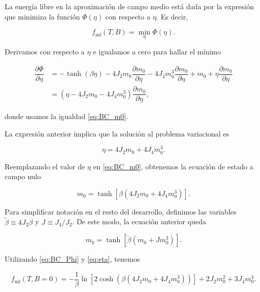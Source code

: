 \documentclass[10pt]{article}
\begin{document}
La energ\'ia libre en la aproximaci\'on de campo medio est\'a dada por la expresi\'on que minimiza la funci\'on $\Phi(\eta)$ con respecto a $\eta$. Es decir,

\begin{equation}
f_{\mathrm{mf}}(T,B) = \min_{\eta} \Phi(\eta).
\end{equation}

Derivamos con respecto a $\eta$ e igualamos a cero para hallar el m\'inimo

\begin{align}
\dfrac{\partial \Phi}{\partial \eta} &= - \tanh\left(\beta \eta\right) - 4 J_2 m_0 \dfrac{\partial m_0}{\partial \eta} - 4 J_4 m_0^3 \dfrac{\partial m_0}{\partial \eta} + m_0 + \eta \dfrac{\partial m_0}{\partial \eta} \nonumber \\
&= \left(\eta - 4 J_2 m_0 - 4 J_4 m_0^3\right) \dfrac{\partial m_0}{\partial \eta},
\end{align}

donde usamos la igualdad \ref{eq:BC_m0}.

La expresi\'on anterior implica que la soluci\'on al problema variacional es 

\begin{equation}\label{eq:eta}
\eta = 4 J_2 m_0 + 4 J_4 m_0^3.
\end{equation}

Reemplazando el valor de $\eta$ en \ref{eq:BC_m0}, obtenemos la ecuaci\'on de estado a campo nulo

\begin{equation}
m_0 = \tanh\left[\beta (4 J_2 m_0 + 4 J_4 m_0^3)\right].
\end{equation}

Para simplificar notaci\'on en el resto del desarrollo, definimos las variables $\tilde{\beta} \equiv 4 J_2 \beta$ y $J \equiv J_4/J_2$. De este modo, la ecuaci\'on anterior queda

\begin{equation}
m_0 = \tanh\left[\tilde{\beta} (m_0 + J m_0^3)\right].
\end{equation}



Utilizando  \ref{eq:BC_Phi} y \ref{eq:eta}, tenemos

\begin{equation}
f_{\mathrm{mf}}(T,B=0) = -\dfrac{1}{\beta} \ln \left[2 \cosh\left(\beta ( 4 J_2 m_0 + 4 J_4 m_0^3)\right) \right] +2 J_2 m_0^2 + 3 J_4 m_0^4.
\end{equation}
\end{document}
